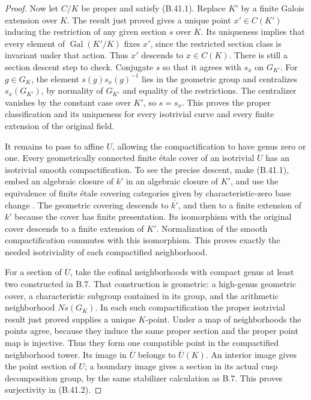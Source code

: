 \documentclass[11pt,oneside]{article}
\begin{document}
\begin{proof}
Now let $C/K$ be proper and satisfy (B.41.1).
Replace $K'$ by a finite Galois extension over
$K$. The result just proved gives a unique point
$x'\in C(K')$ inducing the restriction of any
given section $s$ over $K$. Its uniqueness implies
that every element of $\operatorname{Gal}(K'/K)$
fixes $x'$, since the restricted section class is
invariant under that action. Thus $x'$ descends
to $x\in C(K)$. There is still a section descent
step to check. Conjugate $s$ so that it agrees
with $s_x$ on $G_{K'}$. For $g\in G_K$, the
element $s(g)s_x(g)^{-1}$ lies in the geometric
group and centralizes $s_x(G_{K'})$, by normality
of $G_{K'}$ and equality of the restrictions.
The centralizer vanishes by the constant case
over $K'$, so $s=s_x$. This proves the proper
classification and its uniqueness for every
isotrivial curve and every finite extension of
the original field.

It remains to pass to affine $U$, allowing the
compactification to have genus zero or one.
Every geometrically connected finite \'etale
cover of an isotrivial $U$ has an isotrivial
smooth compactification. To see the precise
descent, make (B.41.1), embed an algebraic closure
of $k'$ in an algebraic closure of $K'$, and
use the equivalence of finite \'etale covering
categories given by characteristic-zero base
change \cite{B_LandesmanBaseChange}. The
geometric covering descends to $\overline{k'}$,
and then to a finite extension of $k'$ because
the cover has finite presentation. Its isomorphism
with the original cover descends to a finite
extension of $K'$. Normalization of the smooth
compactification commutes with this isomorphism.
This proves exactly the needed isotriviality of
each compactified neighborhood.

For a section of $U$, take the cofinal
neighborhoods with compact genus at least two
constructed in B.7. That construction is
geometric: a high-genus geometric cover,
a characteristic subgroup contained in its
group, and the arithmetic neighborhood
$N s(G_K)$. In each such compactification the
proper isotrivial result just proved supplies
a unique $K$-point. Under a map of neighborhoods
the points agree, because they induce the same
proper section and the proper point map is
injective. Thus they form one compatible point
in the compactified neighborhood tower. Its
image in $\overline U$ belongs to $\overline U(K)$.
An interior image gives the point section of
$U$; a boundary image gives a section in its
actual cusp decomposition group, by the same
stabilizer calculation as B.7. This proves
surjectivity in (B.41.2).


\end{proof}
\end{document}
